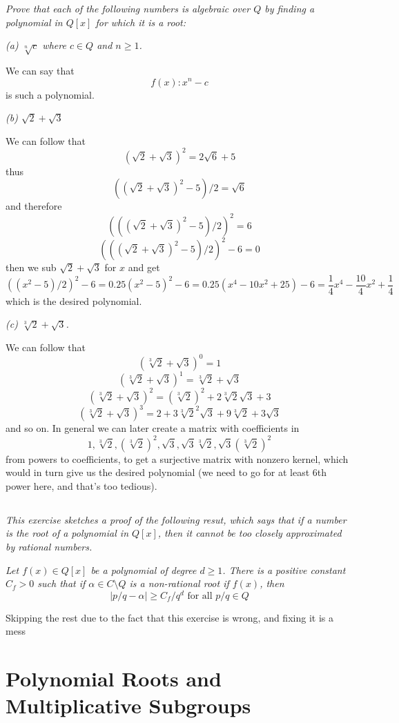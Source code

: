 \documentclass[11pt,oneside,titlepage]{book}
\begin{document}
\textit{Prove that each of the following numbers is algebraic over $Q$
  by finding a polynomial in $Q[x]$ for which it is a root:}

\textit{(a) $\sqrt[n]{c}$ where $c \in Q$ and $n \geq 1$.}

We can say that
$$f(x): x^n - c$$
is such a polynomial.

\textit{(b) $\sqrt{2} + \sqrt{3}$}

We can follow that
$$(\sqrt{2} + \sqrt{3})^2 = 2\sqrt{6} + 5$$
thus
$$((\sqrt{2} + \sqrt{3})^2 - 5) / 2 = \sqrt{6}$$
and therefore
$$(((\sqrt{2} + \sqrt{3})^2 - 5) / 2)^2 = 6$$
$$(((\sqrt{2} + \sqrt{3})^2 - 5) / 2)^2 - 6 = 0$$
then we sub $\sqrt{2} + \sqrt{3}$ for $x$ and get
$$((x^2 - 5) / 2)^2 - 6 = 0.25 (x^2 - 5)^2 - 6 = 0.25 (x^4 - 10x^2 + 25)  - 6 =
\frac{1}{4}x^4 - \frac{10}{4}x^2 + \frac{1}{4}$$
which is the desired polynomial.

\textit{(c) $\sqrt[3]{2} + \sqrt{3}$.}

We can follow that
$$(\sqrt[3]{2} + \sqrt{3})^0 = 1$$
$$(\sqrt[3]{2} + \sqrt{3})^1 = \sqrt[3]{2} + \sqrt{3}$$
$$(\sqrt[3]{2} + \sqrt{3})^2 = (\sqrt[3]{2})^2 + 2\sqrt[3]{2}\sqrt{3} + 3$$
$$(\sqrt[3]{2} + \sqrt{3})^3 = 2 + 3 \sqrt[3]{2}^2 \sqrt{3} + 9 \sqrt[3]{2}  + 3\sqrt{3}$$
and so on. In general we can later create a matrix with coefficients
in
$$1, \sqrt[3]{2}, (\sqrt[3]{2})^2, \sqrt{3}, \sqrt{3}\sqrt[3]{2}, \sqrt{3}(\sqrt[3]{2})^2$$
from powers to coefficients, to get a surjective matrix with nonzero
kernel, which would in turn give us the desired polynomial (we need to go for at least
6th power here, and that's too tedious).

\subsection{}

\textit{This exercise sketches a proof of the following resut, which says that if a number is the root
  of a polynomial in $Q[x]$, then it cannot be too closely approximated by rational numbers.}

\textit{Let $f(x) \in Q[x]$ be a polynomial of degree $d \geq
1$. There is a positive constant $C_f > 0$ such that if $\alpha \in C
\setminus Q$ is a non-rational root if $f(x)$, then
$$|p/q - \alpha| \geq C_f/q^d \text{ for all }p/q \in Q$$}

Skipping the rest due to the fact that this exercise is wrong, and
fixing it is a mess

\section{Polynomial Roots and Multiplicative Subgroups}
\end{document}
